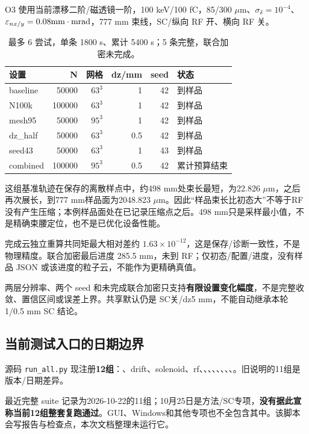 O3 使用当前漂移二阶/磁透镜一阶，100 keV/100 fC，85/300 $\mu$m、$\sigma_\delta=10^{-4}$、$\varepsilon_{nx/y}=0.08\mathrm{mm\cdot mrad}$，777 mm 束线，SC/纵向 RF 开、横向 RF 关。
\begin{table}[H]\centering\small
\begin{tabular}{lrrrrl}\toprule
设置 & N & 网格 & dz/mm & seed & 状态 \\ \midrule
baseline & 50000 & $63^3$ & 1 & 42 & 到样品 \\
N100k & 100000 & $63^3$ & 1 & 42 & 到样品 \\
mesh95 & 50000 & $95^3$ & 1 & 42 & 到样品 \\
dz\_half & 50000 & $63^3$ & 0.5 & 42 & 到样品 \\
seed43 & 50000 & $63^3$ & 1 & 43 & 到样品 \\
combined & 100000 & $95^3$ & 0.5 & 42 & 累计预算结束 \\
\bottomrule\end{tabular}
\caption{最多 6 尝试，单条 1800 s、累计 5400 s；5 条完整，联合加密未完成。}
\end{table}

这组基准轨迹在保存的离散样点中，约498 mm处束长最短，为22.826 $\mu$m，之后再次展长，到777 mm样品面为2048.823 $\mu$m。因此“样品束长比初态大”不等于RF没有产生压缩；本例样品面处在已记录压缩点之后。498 mm只是采样最小值，不是精确束腰定位，也不是已优化设备性能。

完成云独立重算共同矩最大相对差约 $1.63\times10^{-12}$，这是保存/诊断一致性，不是物理精度。联合加密最后进度 285.5 mm，未到 RF；仅初态/配置/进度，没有样品 JSON 或该进度的粒子云，不能作为更精确真值。

两层分辨率、两个 seed 和未完成联合加密只支持\textbf{有限设置变化幅度}，不是完整收敛、置信区间或误差上界。共享默认仍是 SC关/dz5 mm，不能自动继承本轮 1/0.5 mm SC 结论。

\subsection{当前测试入口的日期边界}
源码 \texttt{run\_all.py} 现注册\textbf{12组}：、drift、solenoid、rf、、、、、、、、。旧说明的11组是版本/日期差异。

最近完整 suite 记录为2026-10-22的11组；10月25日是方法/SC专项，\textbf{没有据此宣称当前12组整套复跑通过}。GUI、Windows和其他专项也不全包含其中。该脚本会写报告与检查点，本次文档整理未运行它。

